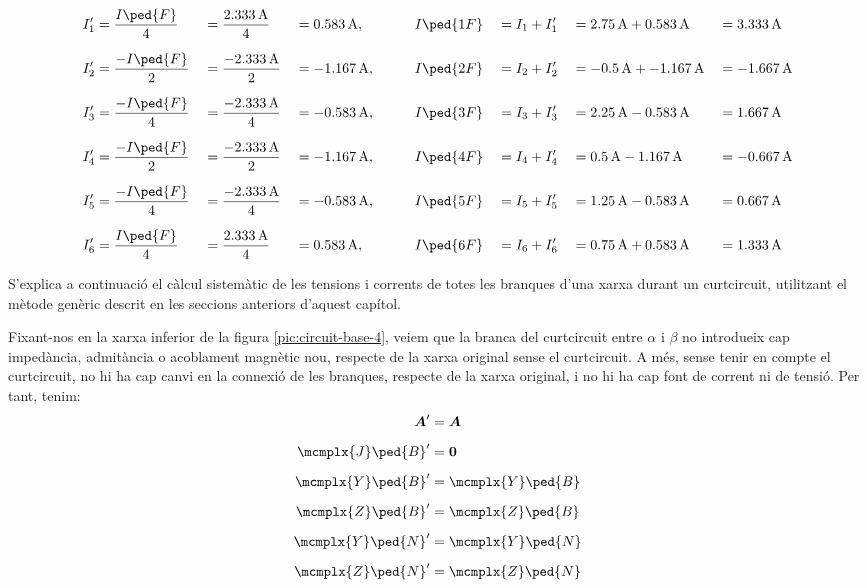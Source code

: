 \begin{exemple}
	\begin{alignat*}{7}
		I_1' &= \frac{I\ped{F}}{4} &&=\frac{\qty{2,333}{A}}{4} &&= \qty{0,583}{A}, &&\qquad I\ped{1F} && = I_1 + I_1' &&= \qty{2,75}{A}+\qty{0,583}{A} &&= \qty{3,333}{A} \\[1.5ex]
		I_2' &= \frac{-I\ped{F}}{2} &&=\frac{\qty{-2,333}{A}}{2} &&= \qty{-1,167}{A}, &&\qquad I\ped{2F} && = I_2 + I_2' &&= \qty{-0,5}{A}+\qty{-1,167}{A} &&= \qty{-1,667}{A} \\[1.5ex]
		I_3' &= \frac{-I\ped{F}}{4} &&=\frac{\qty{-2,333}{A}}{4} &&= \qty{-0,583}{A}, &&\qquad I\ped{3F} && = I_3 + I_3' &&= \qty{2,25}{A}-\qty{0,583}{A} &&= \qty{1,667}{A} \\[1.5ex]
		I_4' &= \frac{-I\ped{F}}{2} &&=\frac{\qty{-2,333}{A}}{2} &&= \qty{-1,167}{A}, &&\qquad I\ped{4F} && = I_4 + I_4' &&= \qty{0,5}{A}-\qty{1,167}{A} &&= \qty{-0,667}{A} \\[1.5ex]
		I_5' &= \frac{-I\ped{F}}{4} &&=\frac{\qty{-2,333}{A}}{4} &&= \qty{-0,583}{A}, &&\qquad I\ped{5F} && = I_5 + I_5' &&= \qty{1,25}{A}-\qty{0,583}{A} &&= \qty{0,667}{A} \\[1.5ex]
		I_6' &= \frac{I\ped{F}}{4}  &&=\frac{\qty{2,333}{A}}{4} &&= \qty{0,583}{A}, &&\qquad I\ped{6F} && = I_6 + I_6' &&= \qty{0,75}{A}+\qty{0,583}{A} &&= \qty{1,333}{A}
	\end{alignat*}
\end{exemple}

S'explica a continuació el càlcul sistemàtic de les tensions i corrents de totes les branques d'una xarxa durant un curtcircuit, utilitzant el mètode genèric descrit en les seccions anteriors d'aquest capítol.

Fixant-nos en la xarxa inferior de la figura \vref{pic:circuit-base-4}, veiem que la branca del curtcircuit entre $\alpha$ i $\beta$ no introdueix cap impedància, admitància o acoblament magnètic nou, respecte de la xarxa original sense el curtcircuit.
A més, sense tenir en compte el curtcircuit, no hi ha cap canvi en la connexió de les branques, respecte de la xarxa original, i no hi ha cap font de corrent ni de tensió. Per tant, tenim:
\begin{subequations}
\begin{align}
   \boldsymbol{A}' &= \boldsymbol{A} \\[0.5em]
   \mcmplx{J}\ped{B}' &= \boldsymbol{0} \\[0.5em]
   \mcmplx{Y}\ped{B}' &= \mcmplx{Y}\ped{B} \\[0.5em]
   \mcmplx{Z}\ped{B}' &= \mcmplx{Z}\ped{B} \\[0.5em]
   \mcmplx{Y}\ped{N}' &= \mcmplx{Y}\ped{N} \\[0.5em]
   \mcmplx{Z}\ped{N}' &= \mcmplx{Z}\ped{N}
\end{align}
\end{subequations}

